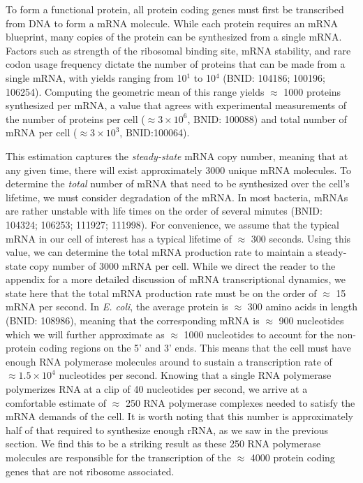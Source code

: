 To form a functional protein, all protein coding genes must first be
transcribed from DNA to form a mRNA molecule. While each protein requires an
mRNA blueprint, many copies of the protein can be synthesized from a single
mRNA. Factors such as strength of the ribosomal binding site, mRNA stability,
and rare codon usage frequency dictate the number of proteins that can be
made from a single mRNA, with yields ranging from 10$^1$ to 10$^4$ (BNID:
104186; 100196; 106254). Computing the geometric mean of this range yields
$\approx$ 1000 proteins synthesized per mRNA, a value that agrees with
experimental measurements of the number of proteins per cell ($\approx 3
\times 10^6$, BNID: 100088) and total number of mRNA per cell ($\approx 3
\times 10^3$, BNID:100064).

This estimation captures the \textit{steady-state} mRNA copy number, meaning
that at any given time, there will exist approximately 3000 unique mRNA
molecules. To determine the \textit{total} number of mRNA that need to be
synthesized over the cell's lifetime, we must consider degradation of the
mRNA. In most bacteria, mRNAs are rather unstable with life times on the
order of several minutes (BNID: 104324; 106253; 111927; 111998). For
convenience, we assume that the typical mRNA in our cell of interest has a
typical lifetime of $\approx$ 300 seconds. Using this value, we can determine
the total mRNA production rate to maintain a steady-state copy number of 3000
mRNA per cell. While we direct the reader to the appendix for a more detailed
discussion of mRNA transcriptional dynamics, we state here that the total
mRNA production rate must be on the order of $\approx$ 15 mRNA per second. In
\textit{E. coli}, the average protein is $\approx$ 300 amino acids in length
(BNID: 108986), meaning that the corresponding mRNA is $\approx$ 900
nucleotides which we will further approximate as $\approx$ 1000 nucleotides
to account for the non-protein coding regions on the 5' and 3' ends. This
means that the cell must have enough RNA polymerase molecules around to
sustain a transcription rate of $\approx 1.5 \times 10^4$ nucleotides per
second. Knowing that a single RNA polymerase polymerizes RNA at a clip of 40
nucleotides per second, we arrive at a comfortable estimate of $\approx$ 250
RNA polymerase complexes needed to satisfy the mRNA demands of the cell. It
is worth noting that this number is approximately half of that required to
synthesize enough rRNA, as we saw in the previous section. We find this to be
a striking result as these 250 RNA polymerase molecules are responsible for
the transcription of the $\approx$ 4000 protein coding genes that are not
ribosome associated.

